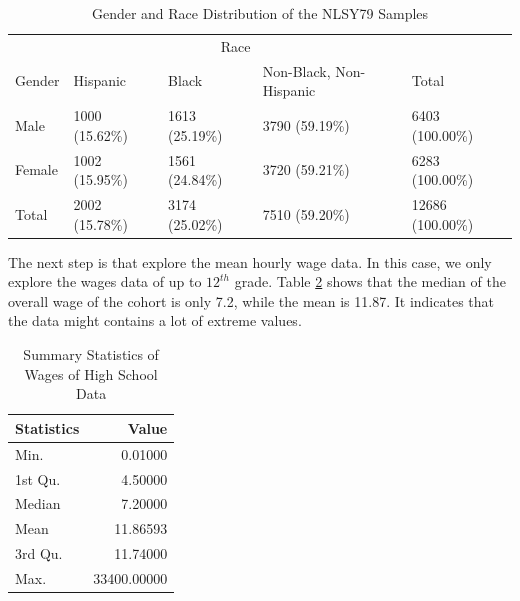 \documentclass{article}
\begin{document}
\begin{table}

\caption{\label{tab:gender-race-table}Gender and Race Distribution of the NLSY79 Samples}
\centering
\begin{tabular}[t]{l|l|l|l|l}
\hline
\multicolumn{1}{c|}{ } & \multicolumn{3}{c|}{Race} & \multicolumn{1}{c}{ } \\
\cline{2-4}
Gender & Hispanic & Black & Non-Black, Non-Hispanic & Total\\
\hline
Male & 1000 (15.62\%) & 1613 (25.19\%) & 3790 (59.19\%) & 6403 (100.00\%)\\
\hline
Female & 1002 (15.95\%) & 1561 (24.84\%) & 3720 (59.21\%) & 6283 (100.00\%)\\
\hline
Total & 2002 (15.78\%) & 3174 (25.02\%) & 7510 (59.20\%) & 12686 (100.00\%)\\
\hline
\end{tabular}
\end{table}

The next step is that explore the mean hourly wage data. In this case, we only explore the wages data of up to \(12^{th}\) grade. Table \ref{tab:summarytable} shows that the median of the overall wage of the cohort is only 7.2, while the mean is 11.87. It indicates that the data might contains a lot of extreme values.

\begin{table}

\caption{\label{tab:summarytable}Summary Statistics of Wages of High School Data}
\centering
\begin{tabular}[t]{l|r}
\hline
Statistics & Value\\
\hline
Min. & 0.01000\\
\hline
1st Qu. & 4.50000\\
\hline
Median & 7.20000\\
\hline
Mean & 11.86593\\
\hline
3rd Qu. & 11.74000\\
\hline
Max. & 33400.00000\\
\hline
\end{tabular}
\end{table}
\end{document}
